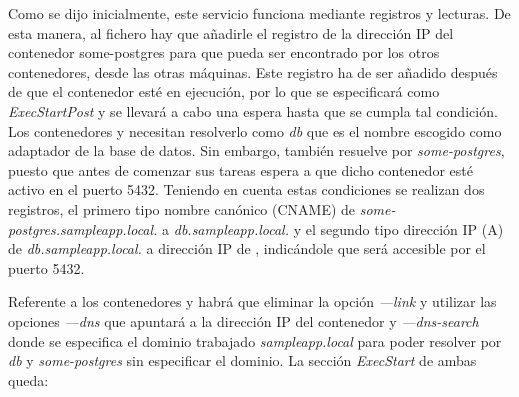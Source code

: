 Como se dijo inicialmente, este servicio funciona mediante registros y lecturas. De esta manera, al fichero  hay que añadirle el registro de la dirección IP del contenedor some-postgres para que pueda ser encontrado por los otros contenedores, desde las otras máquinas. Este registro ha de ser añadido después de que el contenedor esté en ejecución, por lo que se especificará como \textit{ExecStartPost} y se llevará a cabo una espera hasta que se cumpla tal condición. Los contenedores  y  necesitan resolverlo como \textit{db} que es el nombre escogido como adaptador de la base de datos. Sin embargo,  también resuelve por \textit{some-postgres}, puesto que antes de comenzar sus tareas espera a que dicho contenedor esté activo en el puerto 5432. Teniendo en cuenta estas condiciones se realizan dos registros, el primero tipo nombre canónico (CNAME) de \textit{some-postgres.sampleapp.local.} a \textit{db.sampleapp.local.} y el segundo tipo dirección IP (A) de \textit{db.sampleapp.local.} a dirección IP de , indicándole que será accesible por el puerto 5432.

\begin{codelisting}
\label{code:user-data-skydns-postgresql}
\end{codelisting}

Referente a los contenedores \kode{app-job} y  habrá que eliminar la opción \textit{---link} y utilizar las opciones \textit{---dns} que apuntará a la dirección IP del contenedor  y \textit{---dns-search} donde se especifica el dominio trabajado \textit{sampleapp.local} para poder resolver por \textit{db} y \textit{some-postgres} sin especificar el dominio. La sección \textit{ExecStart} de ambas queda:


